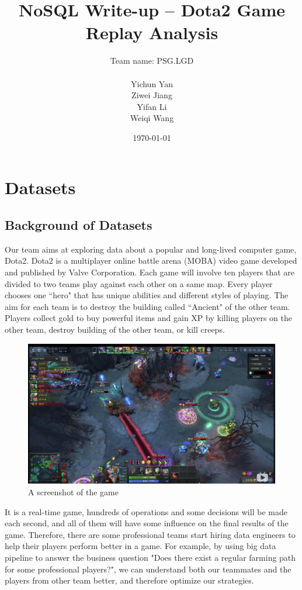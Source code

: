 \documentclass{article}
\title{NoSQL Write-up -- Dota2 Game Replay Analysis}
\author{
	Team name: PSG.LGD \\ \\
	Yichun Yan \\
	Ziwei Jiang \\
	Yifan Li \\
	Weiqi Wang
}
\date{\today}
\begin{document}
\maketitle

\tableofcontents
\clearpage


\section{Datasets}

\subsection{Background of Datasets}

Our team aims at exploring data about a popular and long-lived computer game, Dota2. Dota2 is a multiplayer online battle arena (\gls{MOBA}) video game developed and published by Valve Corporation. Each game will involve ten players that are divided to two teams play against each other on a same map. Every player chooses one ``hero" that has unique abilities and different styles of playing. The aim for each team is to destroy the building called ``\gls{Ancient}" of the other team. Players collect \gls{gold} to buy powerful items and gain \gls{XP} by killing players on the other team, destroy building of the other team, or kill \gls{creeps}.

\begin{figure}[H]
	\centering
	\includegraphics[width=\linewidth]{pic/combat.png}
	\caption{A screenshot of the game}
\end{figure}

It is a real-time game, hundreds of operations and some decisions will be made each second, and all of them will have some influence on the final results of the game. Therefore, there are some professional teams start hiring data engineers to help their players perform better in a game. For example, by using big data pipeline to answer the business question "Does there exist a regular farming path for some professional players?", we can understand both our teammates and the players from other team better, and therefore optimize our strategies.
\end{document}
